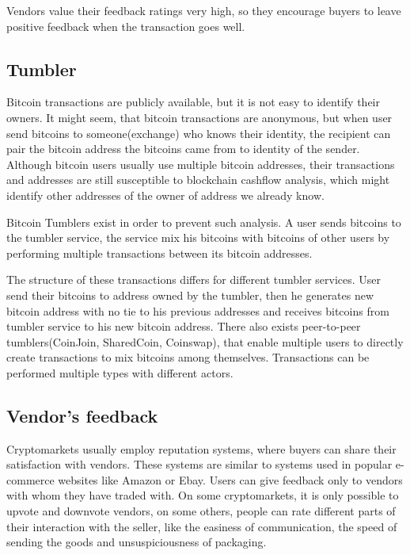 \documentclass[
  digital, %
  table,   %
  lof,     %
  lot,     %
  oneside
]{fithesis3}
\begin{document}
Vendors value their feedback ratings very high, so they encourage buyers to leave
 positive feedback when the transaction goes well.
 
\subsection{Tumbler}
Bitcoin transactions are publicly available, but it is not easy to identify their owners.
It might seem, that bitcoin transactions are anonymous, but when user send bitcoins to
someone(exchange) who knows their identity, the recipient can pair the bitcoin address
the bitcoins came from to identity of the sender.
Although bitcoin users usually use multiple bitcoin addresses,
their transactions and addresses are still 
susceptible to blockchain cashflow analysis,
which might identify other addresses of the owner of address we already know.

Bitcoin Tumblers exist in order to prevent such analysis.
A user sends bitcoins to the tumbler service, the service mix his bitcoins
with bitcoins of other users by performing multiple transactions
between its bitcoin addresses. \parencite{moser2013inquiry}
  
The structure of these transactions differs for different tumbler services.
User send their bitcoins to address owned by the tumbler,
then he generates new bitcoin address with no tie to his previous addresses
and receives bitcoins from tumbler service to his new bitcoin address.
 There also exists peer-to-peer tumblers(CoinJoin, SharedCoin, Coinswap),
that enable multiple users to directly create transactions to mix bitcoins among themselves.
Transactions can be performed multiple types with different actors.

\subsection{Vendor's feedback}

Cryptomarkets usually employ reputation systems,
where buyers can share their satisfaction with vendors.
These systems are similar to systems used in popular e-commerce websites like Amazon or Ebay.
Users can give feedback only to vendors with whom they have traded with.
On some cryptomarkets, it is only possible to upvote and downvote vendors,
on some others, people can rate different parts of their interaction with the seller,
like the easiness of communication,
the speed of sending the goods and unsuspiciousness of packaging.
\end{document}
